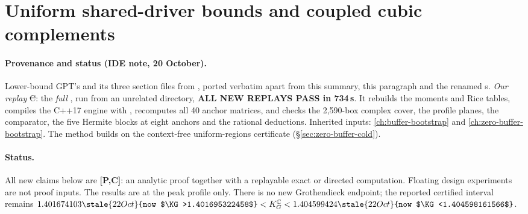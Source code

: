 \section{Uniform shared-driver bounds and coupled cubic complements}
\label{ch:uniform-shared-bootstrap}

\paragraph{Provenance and status (IDE note, 20 October).} Lower-bound GPT's  and its three section files from
, ported verbatim apart from this summary, this paragraph and the renamed s. \emph{Our replay} \st{C}:
the \emph{full} , run from an unrelated directory, \textbf{ALL NEW REPLAYS PASS in 734\,s}. It rebuilds the moments and Rice tables, compiles the C++17
engine with , recomputes all 40 anchor matrices, and checks the 2{,}590-box complex cover, the profile planes, the comparator, the five Hermite blocks at eight anchors
and the rational deductions. Inherited inputs: \autoref{ch:buffer-bootstrap} and \autoref{ch:zero-buffer-bootstrap}. The method builds on the context-free uniform-regions certificate
(\S\ref{sec:zero-buffer-cold}).

\paragraph{Status.}
All new claims below are \textbf{[P,C]}: an analytic proof together with
a replayable exact or directed computation. Floating design experiments
are not proof inputs. The results are at the peak profile only. There is
no new Grothendieck endpoint; the reported certified interval remains
$1.401674103\stale{22 Oct}{now $\KG>1.401695322458$}<K_G^{\mathbb C}<1.404599424\stale{22 Oct}{now $\KG<1.404598161566$}$.

